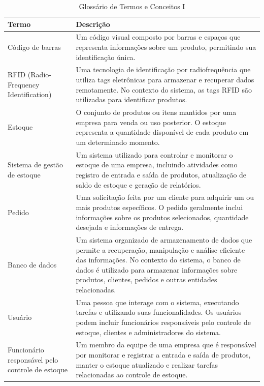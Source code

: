 \documentclass[
	12pt,				%
	openright,			%
	twoside,			%
	a4paper,			%
	english,			%
	brazil				%
	]{abntex2}
\begin{document}
\begin{table}[htb]
	\centering
	\caption{\label{tab:glossario}Glossário de Termos e Conceitos I}
	\begin{tabular}{|p{3.5cm}|p{10cm}|}
		\hline
		\textbf{Termo} & \textbf{Descrição} \\
			\hline
			Código de barras & Um código visual composto por barras e espaços que representa informações sobre um produto, permitindo sua identificação única. \\
			\hline
			RFID (Radio-Frequency Identification) & Uma tecnologia de identificação por radiofrequência que utiliza tags eletrônicas para armazenar e recuperar dados remotamente. No contexto do sistema, as tags RFID são utilizadas para identificar produtos. \\
			\hline
			Estoque & O conjunto de produtos ou itens mantidos por uma empresa para venda ou uso posterior. O estoque representa a quantidade disponível de cada produto em um determinado momento. \\
			\hline
			Sistema de gestão de estoque & Um sistema utilizado para controlar e monitorar o estoque de uma empresa, incluindo atividades como registro de entrada e saída de produtos, atualização de saldo de estoque e geração de relatórios. \\
			\hline
			Pedido & Uma solicitação feita por um cliente para adquirir um ou mais produtos específicos. O pedido geralmente inclui informações sobre os produtos selecionados, quantidade desejada e informações de entrega. \\
			\hline
			Banco de dados & Um sistema organizado de armazenamento de dados que permite a recuperação, manipulação e análise eficiente das informações. No contexto do sistema, o banco de dados é utilizado para armazenar informações sobre produtos, clientes, pedidos e outras entidades relacionadas. \\
			\hline
			Usuário & Uma pessoa que interage com o sistema, executando tarefas e utilizando suas funcionalidades. Os usuários podem incluir funcionários responsáveis pelo controle de estoque, clientes e administradores do sistema. \\
			\hline
			Funcionário responsável pelo controle de estoque & Um membro da equipe de uma empresa que é responsável por monitorar e registrar a entrada e saída de produtos, manter o estoque atualizado e realizar tarefas relacionadas ao controle de estoque. \\
			\hline
	\end{tabular}
\end{table}
\end{document}
